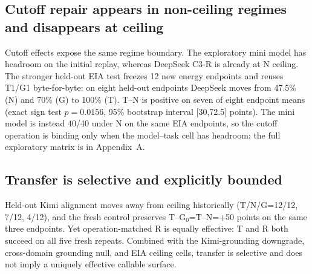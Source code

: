 \subsection{Cutoff repair appears in non-ceiling regimes and disappears at ceiling}
Cutoff effects expose the same regime boundary. The exploratory mini model has headroom on the initial replay, whereas DeepSeek C3-R is already at N ceiling. The stronger held-out EIA test freezes 12 new energy endpoints and reuses T1/G1 byte-for-byte: on eight held-out endpoints DeepSeek moves from 47.5\% (N) and 70\% (G) to 100\% (T). T--N is positive on seven of eight endpoint means (exact sign test $p=0.0156$, 95\% bootstrap interval [30,72.5] points). The mini model is instead 40/40 under N on the same EIA endpoints, so the cutoff operation is binding only when the model--task cell has headroom; the full exploratory matrix is in Appendix~A.

\subsection{Transfer is selective and explicitly bounded}
Held-out Kimi alignment moves away from ceiling historically (T/N/G=12/12, 7/12, 4/12), and the fresh control preserves T--G$_0$=T--N=+50 points on the same three endpoints. Yet operation-matched R is equally effective: T and R both succeed on all five fresh repeats. Combined with the Kimi-grounding downgrade, cross-domain grounding null, and EIA ceiling cells, transfer is selective and does not imply a uniquely effective callable surface.
